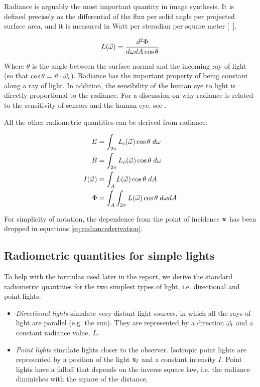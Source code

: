 Radiance is arguably the most important quantity in image synthesis. It is defined precisely as the differential of the flux per solid angle per projected surface area, and it is measured in Watt per steradian per square meter [\si{\watt\per\steradian\meter\square}].

$$
L(\vec{\omega}) = \frac{d^2 \Phi}{d\omega dA \cos \theta}
$$

Where $\theta$ is the angle between the surface normal and the incoming ray of light (so that $\cos\theta = \vec{n} \cdot \vec{\omega}_i$). Radiance has the important property of being constant along a ray of light. In addition, the sensibility of the human eye to light is directly proportional to the radiance. For a discussion on why radiance is related to the sensitivity of sensors and the human eye, see \cite{Cohen:1993:RRI:154731}.

All the other radiometric quantities can be derived from radiance:

\begin{equation}
\begin{split}
E &= \int_{2\pi} L_i(\vec{\omega}) \cos\theta \; d\omega \\
B &= \int_{2\pi} L_o(\vec{\omega}) \cos\theta \; d\omega \\
I(\vec{\omega}) &= \int_A L(\vec{\omega}) \cos\theta \; dA \\
\Phi &= \int_A \int_{2\pi} L(\vec{\omega}) \cos\theta \; d\omega dA
\end{split}
\label{eq:radiancederivation} 
\end{equation}

For simplicity of notation, the dependence from the point of incidence $\mathbf{x}$ has been dropped in equations \ref{eq:radiancederivation}. 

\subsection{Radiometric quantities for simple lights}

To help with the formulas used later in the report, we derive the standard radiometric quantities for the two simplest types of light, i.e. directional and point lights.
\begin{itemize}
	\item \textit{Directional lights} simulate very distant light sources, in which all the rays of light are parallel (e.g. the sun). They are represented by a direction $\vec{\omega}_l$ and a constant radiance value, $L$. 
	\item \textit{Point lights} simulate lights closer to the observer. Isotropic point lights are represented by a position of the light $\mathbf{x}_l$ and a constant intensity $I$. Point lights have a falloff that depends on the inverse square law, i.e. the radiance diminishes with the square of the distance.
\end{itemize}

